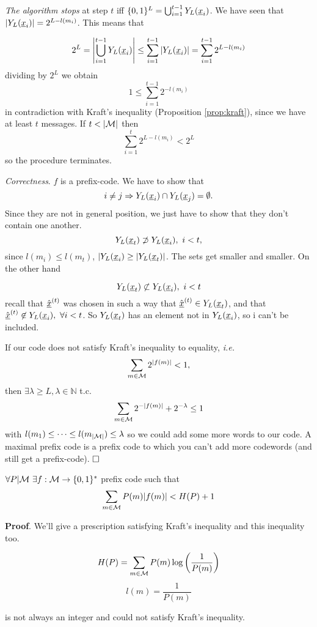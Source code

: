 \noindent\emph{The algorithm stops} at step $t$ iff $\{0, 1\}^L = \bigcup_{i = 1}^{t-1}Y_L(\underline{x}_i)$. We have seen that $|Y_L(\underline{x}_i)| = 2^{L - l(m_i)}$. This means that

\[
2^L = \left|\bigcup_{i=1}^{t-1}Y_L(\underline{x}_i) \right| \leq \sum_{i=1}^{t-1}|Y_L(\underline{x}_i)| = \sum_{i=1}^{t-1} 2^{L-l(m_i)}
\]
dividing by $2^L$ we obtain
$$1 \leq \sum_{i=1}^{t-1}2^{-l(m_i)}$$
in contradiction with Kraft's inequality (Proposition \ref{prop:kraft}), since we have at least $t$ messages. If $t < |\mathcal{M}|$ then $$\sum_{i=1}^{t} 2^{L-l(m_i)} < 2^L$$ so the procedure terminates.

\noindent\emph{Correctness}. $f$ is a prefix-code. We have to show that $$i \not= j \Rightarrow Y_L(\underline{x}_i) \cap Y_L(\underline{x}_j) = \emptyset.$$
Since they are not in general position, we just have to show that they don't contain one another. $$Y_L(\underline{x}_t) \not\supset Y_L(\underline{x}_i),\ i < t,$$ since $l(m_i) \leq l(m_t)$, $|Y_L(\underline{x}_i) \geq |Y_L(\underline{x}_t)|$. The sets get smaller and smaller. On the other hand

$$Y_L(\underline{x}_t) \not\subset Y_L(\underline{x}_i),\ i < t$$
recall that $\hat{\underline{x}}^{(t)}$ was chosen in such a way that $\hat{\underline{x}}^{(t)} \in Y_L(\underline{x}_t)$, and that $\hat{\str{x}}^{(t)} \not\in \prol{\str{x}_i},\ \forall i < t$. So $Y_L(\underline{x}_t)$ has an element not in $Y_L(\underline{x}_i)$, so i can't be included.

If our code does not satisfy Kraft's inequality to equality, \emph{i.e.} $$\sum_{m\in\mathcal{M}}2^{|f(m)|} < 1,$$ then $\exists \lambda \geq L, \lambda \in \mathbb{N}$ t.c. $$\sum_{m\in\mathcal{M}}2^{-|f(m)|} + 2^{-\lambda} \leq 1$$ with $l(m_1) \leq \cdots \leq l(m_{|\mathcal{M}|}) \leq \lambda$ so we could add some more words to our code. A maximal prefix code is a prefix code to which you can't add more codewords (and still get a prefix-code).
$\hfill\Box$

\begin{prop}
 $\forall P|\mathcal{M}\ \exists f:\mathcal{M} \rightarrow \{0, 1\}^*$ prefix code such that
 \[
  \sum_{m\in \mathcal{M}} P(m)|f(m)| < H(P) + 1
 \]
\end{prop}

\noindent\textbf{Proof}. We'll give a prescription satisfying Kraft's inequality and this inequality too. 

\[
 H(P) = \sum_{m \in \mathcal{M}} P(m)\log\left(\dfrac{1}{P(m)}\right)
\]
\[
l(m) = \dfrac{1}{P(m)}
\]

is not always an integer and could not satisfy Kraft's inequality.


